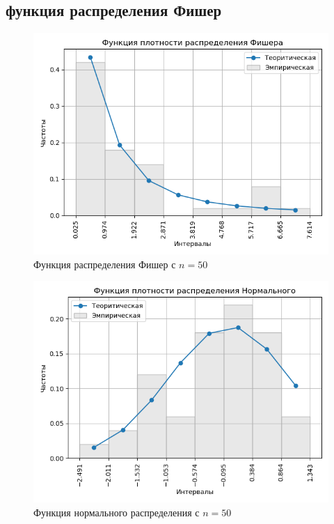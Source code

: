 \documentclass[a4]{article}
\begin{document}
\subsection{функция распределения Фишер}
\begin{center}

\begin{figure}[H]
\caption{Функция распределения Фишер с $ n = 50$}
\includegraphics[width=\textwidth]{output/task1/fisher_50_histogram.png}
\end{figure}

\begin{figure}[H]
\caption{Функция нормального распределения с $ n = 50$}
\includegraphics[width=\textwidth]{output/task1/norm_50_histogram.png}
\end{figure}


\end{center}
\end{document}
